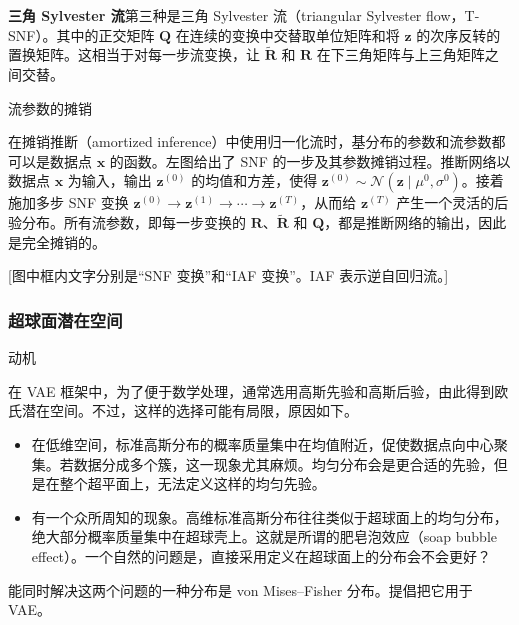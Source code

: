 \textbf{三角 Sylvester 流}\quad 第三种是三角 Sylvester 流（triangular Sylvester flow，T-SNF）。其中的正交矩阵 $\mathbf{Q}$ 在连续的变换中交替取单位矩阵和将 $\mathbf{z}$ 的次序反转的置换矩阵。这相当于对每一步流变换，让 $\tilde{\mathbf{R}}$ 和 $\mathbf{R}$ 在下三角矩阵与上三角矩阵之间交替。

\medskip\noindent 流参数的摊销\par\smallskip
在摊销推断（amortized inference）中使用归一化流时，基分布的参数和流参数都可以是数据点 $\mathbf{x}$ 的函数。左图给出了 SNF 的一步及其参数摊销过程。推断网络以数据点 $\mathbf{x}$ 为输入，输出 $\mathbf{z}^{(0)}$ 的均值和方差，使得 $\mathbf{z}^{(0)}\sim\mathcal{N}(\mathbf{z}\mid\mu^0,\sigma^0)$。接着施加多步 SNF 变换 $\mathbf{z}^{(0)}\to\mathbf{z}^{(1)}\to\cdots\to\mathbf{z}^{(T)}$，从而给 $\mathbf{z}^{(T)}$ 产生一个灵活的后验分布。所有流参数，即每一步变换的 $\mathbf{R}$、$\tilde{\mathbf{R}}$ 和 $\mathbf{Q}$，都是推断网络的输出，因此是完全摊销的。

[图中框内文字分别是“SNF 变换”和“IAF 变换”。IAF 表示逆自回归流。]

\subsubsection{超球面潜在空间}
\label{sec:hyperspherical-vae}
\noindent 动机\par\smallskip
在 VAE 框架中，为了便于数学处理，通常选用高斯先验和高斯后验，由此得到欧氏潜在空间。不过，这样的选择可能有局限，原因如下。
\begin{itemize}
\item 在低维空间，标准高斯分布的概率质量集中在均值附近，促使数据点向中心聚集。若数据分成多个簇，这一现象尤其麻烦。均匀分布会是更合适的先验，但是在整个超平面上，无法定义这样的均匀先验。
\item 有一个众所周知的现象。高维标准高斯分布往往类似于超球面上的均匀分布，绝大部分概率质量集中在超球壳上。这就是所谓的肥皂泡效应（soap bubble effect）。一个自然的问题是，直接采用定义在超球面上的分布会不会更好？
\end{itemize}
能同时解决这两个问题的一种分布是 von Mises–Fisher 分布。提倡把它用于 VAE。

